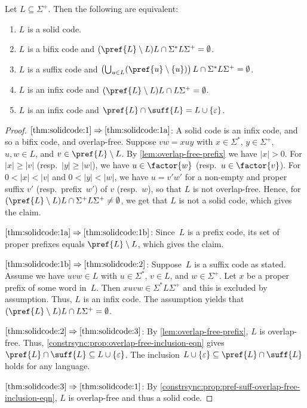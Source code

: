\begin{theorem} \label{thm:solidcode}
Let $L \subseteq \Sigma^+$. Then the following are equivalent:
\begin{enumerate}
\item  \label{thm:solidcode:1} $L$ is a solid code.

\item  \label{thm:solidcode:1a} $L$ is a bifix code and $(\pref{L} \setminus L) L \cap \Sigma^* L \Sigma^+ = \emptyset$.

\item  \label{thm:solidcode:1b}  $L$ is a suffix code and $\left( \bigcup_{u \in L} ( \pref{u}\setminus\{u\} ) \right)L \cap \Sigma^*L\Sigma^+ = \emptyset$.

\item \label{thm:solidcode:2} $L$ is an infix code and $(\pref{L} \setminus L) L \cap L \Sigma^+ = \emptyset$.

\item \label{thm:solidcode:3} $L$ is an infix code and $\pref{L} \cap \suff{L} = L \cup \{\varepsilon\}$.	
\end{enumerate}
\end{theorem}
\begin{proof}
$\ref{thm:solidcode:1}\Rightarrow \ref{thm:solidcode:1a}$: A solid code is an infix code, and so a bifix code, and overlap-free.
Suppose $vw = xuy$
with $x \in \Sigma^*$, $y \in \Sigma^+$, $u, w \in L$, and
$v \in \pref{L} \setminus L$.
By \cref{lem:overlap-free-prefix}
we have $|x| > 0$.
For $|x| \ge |v|$ (resp.~$|y| \ge |w|$), we have $u \in \factor{w}$ (resp.~$u \in \factor{v}$).
For $0 < |x| < |v|$ and $0 < |y| < |w|$,
we have $u = v'w'$ for a non-empty
and proper suffix $v'$ (resp.~prefix~$w'$)
of $v$ (resp.~$w$), so that $L$ is not overlap-free.
Hence, for $(\pref{L} \setminus L) L \cap \Sigma^+ L \Sigma^+  \ne \emptyset$,
we get that $L$ is not a solid code, which gives the claim.

$\ref{thm:solidcode:1a}\Rightarrow \ref{thm:solidcode:1b}$: Since~$L$ is a prefix code,
 its set of proper prefixes equals $\pref{L}\setminus L$, which gives the claim.

$\ref{thm:solidcode:1b}\Rightarrow \ref{thm:solidcode:2}$: Suppose~$L$ is a suffix code as stated.
Assume we have $uvw \in L$ with $u \in \Sigma^*$, $v \in L$,
and $w \in \Sigma^+$.
Let $x$ be a proper prefix of some word in~$L$.
Then $xuvw \in \Sigma^* L \Sigma^+$
and this is excluded by assumption.
Thus, $L$ is an infix code.
The assumption yields that $( \pref{L}\setminus L ) L \cap L \Sigma^+ = \emptyset$.

$\ref{thm:solidcode:2} \Rightarrow \ref{thm:solidcode:3}$: 	By \cref{lem:overlap-free-prefix}, $L$ is overlap-free.
Thus, \cref{constrsync:prop:overlap-free-inclusion-eqn}
gives $\pref{L} \cap \suff{L} \subseteq L \cup \{\varepsilon\}$.
The inclusion
$L \cup \{\varepsilon\} \subseteq \pref{L} \cap \suff{L}$
holds for any language.	

$\ref{thm:solidcode:3} \Rightarrow \ref{thm:solidcode:1}$: 
By \cref{constrsync:prop:pref-suff-overlap-free-inclusion-eqn}, $L$
is overlap-free and thus a solid code.	
\end{proof}

